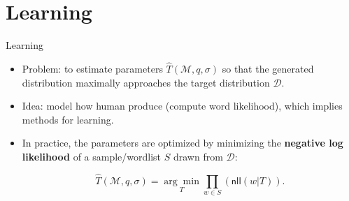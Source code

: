 \section{Learning}
\begin{frame}{Learning}
    \begin{itemize}
    
        \item Problem: to estimate parameters  $\hat{T}(\mathcal{M}, q, \sigma)$ so that the generated distribution maximally approaches the target distribution $\mathcal{D}$.
        \item Idea: model how human produce (compute word likelihood), which implies methods for learning. 
        \item In practice, the parameters are optimized by minimizing the \textbf{negative log likelihood} of a sample/wordlist $S$ drawn from $\mathcal{D}$: 
        
        \begin{equation*}
            \hat{T}(\mathcal{M}, q, \sigma) = \underset{T}{\arg \min }\prod_{w \in S} (\textsf{nll}(w|T)).
        \end{equation*}

    \end{itemize}
\end{frame}
 
 
 







